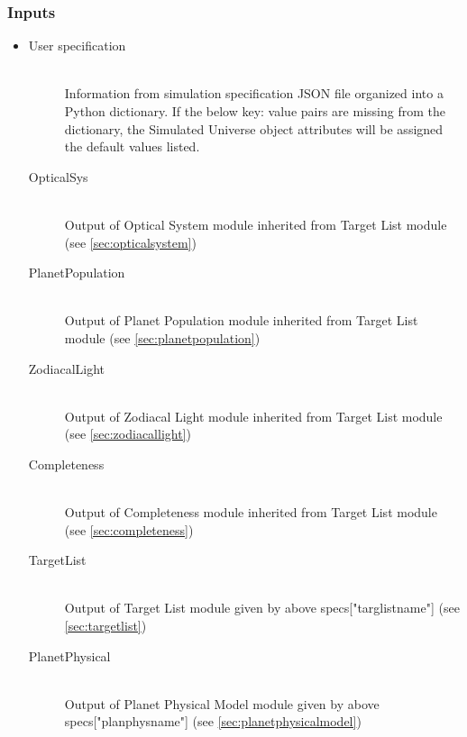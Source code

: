 \documentclass[cleanfoot]{asme2ej}
\begin{document}
\subsubsection*{Inputs}
\begin{itemize}
    \item 
    \begin{description}
        \item[User specification] \hfill \\
        Information from simulation specification JSON file organized into a Python dictionary. If the below key: value pairs are missing from the dictionary, the Simulated Universe object attributes will be assigned the default values listed.
        \item[OpticalSys] \hfill \\
        Output of Optical System module inherited from Target List module (see \ref{sec:opticalsystem})
        \item[PlanetPopulation] \hfill \\
        Output of Planet Population module inherited from Target List module (see \ref{sec:planetpopulation})
        \item[ZodiacalLight] \hfill \\
        Output of Zodiacal Light module inherited from Target List module (see \ref{sec:zodiacallight})
        \item[Completeness] \hfill \\
        Output of Completeness module inherited from Target List module (see \ref{sec:completeness})
        \item[TargetList] \hfill \\
        Output of Target List module given by above specs["targlistname"] (see \ref{sec:targetlist})
        \item[PlanetPhysical] \hfill \\
        Output of Planet Physical Model module given by above specs["planphysname"] (see \ref{sec:planetphysicalmodel})
    \end{description}
\end{itemize}
\end{document}
